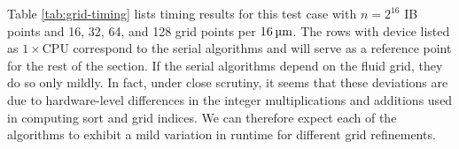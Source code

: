 Table \ref{tab:grid-timing} lists timing results for this test case with
$n=2^{16}$ IB points and 16, 32, 64, and 128 grid points per $16\um$.
The rows with device listed as $1\times\text{CPU}$ correspond to the serial
algorithms and will serve as a reference point for the rest of the section. If
the serial algorithms depend on the fluid grid, they do so only mildly. In
fact, under close scrutiny, it seems that these deviations are due to
hardware-level differences in the integer multiplications and additions used in
computing sort and grid indices. We can therefore expect each of the algorithms
to exhibit a mild variation in runtime for different grid refinements.


